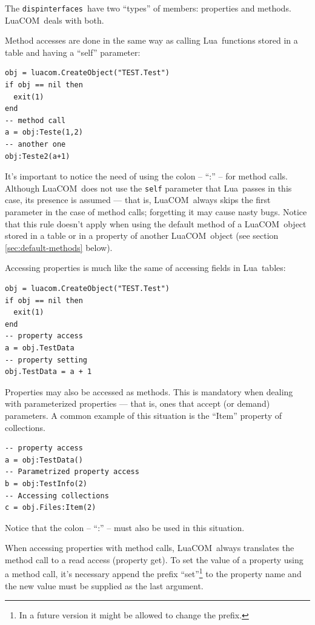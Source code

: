 \documentclass[11pt,a4paper,english]{report}
\newcommand{\ident}[1]{\mbox{\texttt{#1}}}
\newcommand{\techname}[1]{\mbox{#1}}
\newcommand{\lua}{\techname{Lua}}
\newcommand{\luacom}{\techname{LuaCOM}}
\newcommand{\dispinterfaces}{\ident{dispinterfaces}}
\begin{document}
The \dispinterfaces\ have two ``types'' of members: properties and
methods. \luacom\ deals with both.

Method accesses are done in the same way as calling \lua\ functions
stored in a table and having a ``self'' parameter:

\begin{verbatim}
obj = luacom.CreateObject("TEST.Test")
if obj == nil then
  exit(1)
end
-- method call
a = obj:Teste(1,2)
-- another one
obj:Teste2(a+1)
\end{verbatim}

It's important to notice the need of using the colon -- ``:'' -- for
method calls. Although \luacom\ does not use the \ident{self}
parameter that \lua\ passes in this case, its presence is assumed ---
that is, \luacom\ always skips the first parameter in the case of
method calls; forgetting it may cause nasty bugs. Notice that this
rule doesn't apply when using the default method of a \luacom\ object
stored in a table or in a property of another \luacom\ object (see
section \ref{sec:default-methods} below).

Accessing properties is much like the same of accessing fields in
\lua\ tables:

\begin{verbatim}
obj = luacom.CreateObject("TEST.Test")
if obj == nil then
  exit(1)
end
-- property access
a = obj.TestData
-- property setting
obj.TestData = a + 1
\end{verbatim}


Properties may also be accessed as methods. This is mandatory when
dealing with parameterized properties --- that is, ones that accept (or
demand) parameters. A common example of this situation is the ``Item''
property of collections.

\begin{verbatim}
-- property access
a = obj:TestData()
-- Parametrized property access
b = obj:TestInfo(2)
-- Accessing collections
c = obj.Files:Item(2)
\end{verbatim}

Notice that the colon -- ``:'' -- must also be used in this situation.

When accessing properties with method calls, \luacom\ always
translates the method call to a read access (property get). To set the
value of a property using a method call, it's necessary append the
prefix ``set''\footnote{In a future version it might be allowed to
change the prefix.} to the property name and the new value must be
supplied as the last argument.
\end{document}
